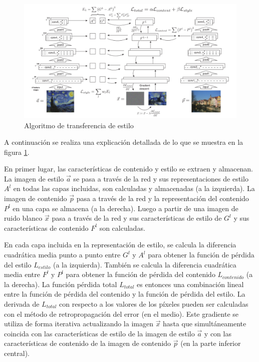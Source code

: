 \documentclass[a4paper,11pt,spanish]{book}
\begin{document}
      \begin{figure}[h]
	\includegraphics[width=\textwidth]{./img/gatys_method.png}
	\caption{Algoritmo de transferencia de estilo}
	\label{fig:gatys_generacion}
      \end{figure}
      A continuación se realiza una explicación detallada de lo que se muestra en la figura \ref{fig:gatys_generacion}.
     
      En primer lugar, las características de contenido y estilo se extraen y almacenan. La imagen de estilo $\overrightarrow{a}$ se pasa a través de la red
      y sus representaciones de estilo $A^l$ en todas las capas incluidas, son calculadas y almacenadas (a la izquierda). La imagen de contenido $\overrightarrow{p}$ pasa a través
      de la red y la representación del contenido $P^l$ en una capa se almacena (a la derecha). Luego a partir de una imagen de ruido blanco $\overrightarrow{x}$ pasa a través de la red y sus
      características de estilo de $G^l$ y sus características de contenido $F^l$ son calculadas.
      
      En cada capa incluida en la representación de estilo, se calcula la diferencia cuadrática media punto a punto entre $G^l$ y $A^l$ para obtener la función de pérdida del estilo
      $L_{estilo}$ (a la izquierda). También se calcula la diferencia cuadrática media entre $F^l$ y $P^l$ para obtener la función de pérdida del contenido $L_{contenido}$ (a la derecha).
      La función pérdida total $L_{total}$ es entonces una combinación lineal entre la función de pérdida del contenido y la función de pérdida del estilo.
      La derivada de  $L_{total}$ con respecto a los valores de los píxeles pueden ser calculadas con el método  de retropropagación del error (en el medio).
      Este gradiente se utiliza de forma iterativa actualizando la imagen $\overrightarrow{x}$ hasta que simultáneamente coincida con las características de estilo de la imagen
      de estilo $\overrightarrow{a}$ y con las características de contenido de la imagen de contenido $\overrightarrow{p}$ (en la parte inferior central).
      
\end{document}
